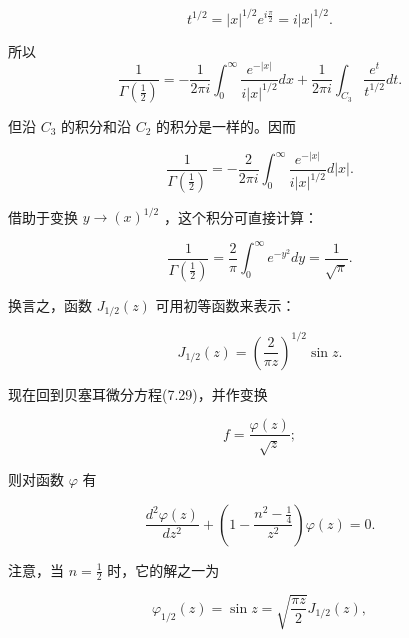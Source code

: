 \begin{equation*}
t ^ {1 / 2} = | x | ^ {1 / 2} e ^ {i \frac {\pi}{2}} = i | x | ^ {1 / 2}.
\end{equation*}

所以
\begin{equation*}
\frac {1}{\Gamma \left(\frac {1}{2}\right)} = - \frac {1}{2 \pi i} \int_ {0} ^ {\infty} \frac {e ^ {- | x |}}{i | x | ^ {1 / 2}} d x + \frac {1}{2 \pi i} \int_ {C _ {3}} \frac {e ^ {t}}{t ^ {1 / 2}} d t.
\end{equation*}

但沿 $C_3$ 的积分和沿 $C_2$ 的积分是一样的。因而

\begin{equation*}
\frac {1}{\Gamma \left(\frac {1}{2}\right)} = - \frac {2}{2 \pi i} \int_ {0} ^ {\infty} \frac {e ^ {- | x |}}{i | x | ^ {1 / 2}} d | x |.
\end{equation*}

借助于变换 $y \to (x)^{1/2}$ ，这个积分可直接计算：

\begin{equation*}
\frac {1}{\Gamma \left(\frac {1}{2}\right)} = \frac {2}{\pi} \int_ {0} ^ {\infty} e ^ {- y ^ {2}} d y = \frac {1}{\sqrt {\pi}}.
\end{equation*}

换言之，函数 $J_{1 / 2}(z)$ 可用初等函数来表示：

\begin{equation*}
J _ {1 / 2} (z) = \left(\frac {2}{\pi z}\right) ^ {1 / 2} \sin z.\tag{7.42}
\end{equation*}

现在回到贝塞耳微分方程(7.29)，并作变换

\begin{equation*}
f = \frac {\varphi (z)}{\sqrt {z}};
\end{equation*}

则对函数 $\varphi$ 有

\begin{equation*}
\frac {d ^ {2} \varphi (z)}{d z ^ {2}} + \left(1 - \frac {n ^ {2} - \frac {1}{4}}{z ^ {2}}\right) \varphi (z) = 0.\tag{7.43}
\end{equation*}

注意，当 $n = \frac{1}{2}$ 时，它的解之一为

\begin{equation*}
\varphi_ {1 / 2} (z) = \sin z = \sqrt {\frac {\pi z}{2}} J _ {1 / 2} (z),\tag{7.44}
\end{equation*}

